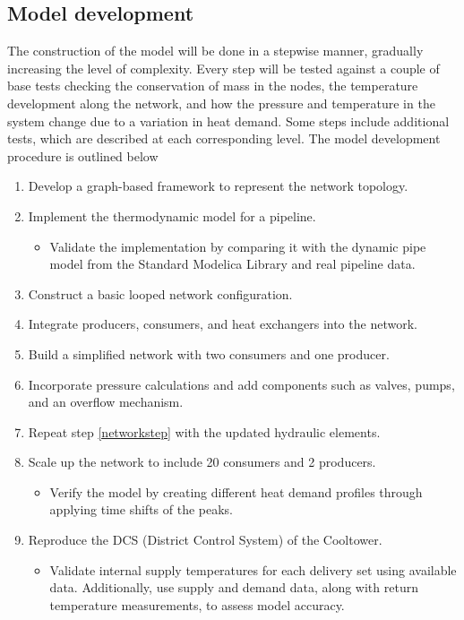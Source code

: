\subsection{Model development}
The construction of the model will be done in a stepwise manner, gradually increasing the level of complexity. Every step will be tested against a couple of base tests checking the conservation of mass in the nodes, the temperature development along the network, and how the pressure and temperature in the system change due to a variation in heat demand. Some steps include additional tests, which are described at each corresponding level. The model development procedure is outlined below

\begin{enumerate}
\item Develop a graph-based framework to represent the network topology.
\item Implement the thermodynamic model for a pipeline.
\begin{itemize}
\item Validate the implementation by comparing it with the dynamic pipe model from the Standard Modelica Library and real pipeline data.
\end{itemize}
\item Construct a basic looped network configuration.
\item Integrate producers, consumers, and heat exchangers into the network.
\item Build a simplified network with two consumers and one producer. \label{networkstep}
\item Incorporate pressure calculations and add components such as valves, pumps, and an overflow mechanism.
\item Repeat step \ref{networkstep} with the updated hydraulic elements.
\item Scale up the network to include 20 consumers and 2 producers.
\begin{itemize}
    \item Verify the model by creating different heat demand profiles through applying time shifts of the peaks. 
\end{itemize}
\item Reproduce the DCS (District Control System) of the Cooltower.
\begin{itemize}
\item Validate internal supply temperatures for each delivery set using available data. Additionally, use supply and demand data, along with return temperature measurements, to assess model accuracy.
\end{itemize}
\end{enumerate}

